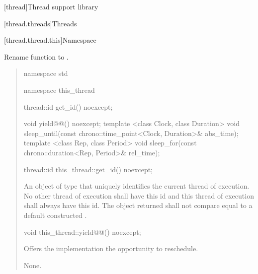 \setcounter{chapter}{29}
[thread]{Thread support library}

\setcounter{section}{2}
[thread.threads]{Threads}

\setcounter{subsection}{1}
[thread.thread.this]{Namespace }

Rename 
function to .

\begin{quote}
\begin{codeblock}
namespace std {
  namespace this_thread {
    thread::id get_id() noexcept;

    void yield@@() noexcept;
    template <class Clock, class Duration>
      void sleep_until(const chrono::time_point<Clock, Duration>& abs_time);
    template <class Rep, class Period>
      void sleep_for(const chrono::duration<Rep, Period>& rel_time);
  }
}
\end{codeblock}

%
%
\begin{itemdecl}
thread::id this_thread::get_id() noexcept;
\end{itemdecl}

\begin{itemdescr}
\pnum
\returns An object of type  that uniquely identifies the current thread of
execution. No other thread of execution shall have this id and this thread of execution shall
always have this id. The object returned shall not compare equal to a default constructed
.
\end{itemdescr}

%
%
\begin{itemdecl}
void this_thread::yield@@() noexcept;
\end{itemdecl}

\begin{itemdescr}
\pnum
\effects Offers the implementation the opportunity to reschedule.

\pnum
\sync None.
\end{itemdescr}
\end{quote}